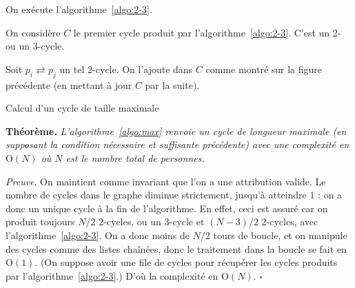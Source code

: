 \documentclass{../../notes}
\begin{document}
  \begin{algorithm}
    \centering
    \begin{algorithmic}[1]
      \State On exécute l'algorithme~\ref{algo:2-3}.

      \State On considère $C$ le premier cycle produit par l'algorithme~\ref{algo:2-3}. C'est un 2- ou un 3-cycle.

      \Statex

      \State Soit $p_i \rightleftarrows p_j$ un tel $2$-cycle.
      \State On l'ajoute dans $C$ comme montré sur la figure précédente (en mettant à jour $C$ par la suite).
      \Statex {}
      \EndWhile
    \end{algorithmic}
    \caption{Calcul d'un cycle de taille maximale}
    \label{algo:max}
  \end{algorithm}

  \textbf{Théorème.} \textsl{L'algorithme~\ref{algo:max} renvoie un cycle de longueur maximale (en supposant la condition nécessaire et suffisante précédente) avec une complexité en $\mathrm{O}(N)$ où $N$ est le nombre total de personnes.}

  \textit{Preuve}.
  On maintient comme invariant que l'on a une attribution valide.
  Le nombre de cycles dans le graphe diminue strictement, jusqu'à atteindre $1$ : on a donc un unique cycle à la fin de l'algorithme.
  En effet, ceci est assuré car on produit toujours $N / 2$ $2$-cycles, ou un $3$-cycle et $(N-3) / 2$ $2$-cycles, avec l'algorithme~\ref{algo:2-3}.
  On a donc moins de $N / 2$ tours de boucle, et on manipule des cycles comme des listes chaînées, donc le traitement dans la boucle se fait en $\mathrm{O}(1)$. (On suppose avoir une file de cycles pour récupérer les cycles produits par l'algorithme~\ref{algo:2-3}.)
  D'où la complexité en $\mathrm{O}(N)$.
  \hfill $\square$
\end{document}
